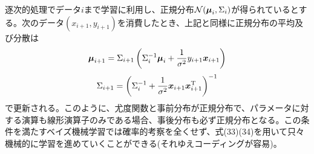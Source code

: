 \documentclass[dvipdfmx, 9pt, a4paper]{jsarticle}
\newcommand{\bm}[1]{{\mbox{\boldmath $#1$}}}
\begin{document}
逐次的処理でデータ$i$まで学習に利用し、正規分布$\mathcal{N}(\bm \mu_i, \Sigma_i)$が得られているとする。次のデータ$(x_{i+1}, y_{i+1})$を消費したとき、上記と同様に正規分布の平均及び分散は
\begin{equation}
\bm \mu_{i+1}=\Sigma_{i+1}\left(\Sigma_i^{-1}\bm \mu_i+\frac{1}{\sigma^2}y_{i+1}\bm x_{i+1} \right)
\end{equation}
\begin{equation}
\Sigma_{i+1}=\left(\Sigma_i^{-1}+\frac{1}{\sigma^2}\bm x_{i+1}\bm x_{i+1}^{\rm T}\right)^{-1}
\end{equation}
で更新される。このように、尤度関数と事前分布が正規分布で、パラメータに対する演算も線形演算子のみである場合、事後分布も必ず正規分布となる。この条件を満たすベイズ機械学習では確率的考察を全くせず、式(33)(34)を用いて只々機械的に学習を進めていくことができる(それゆえコーディングが容易)。
\end{document}
